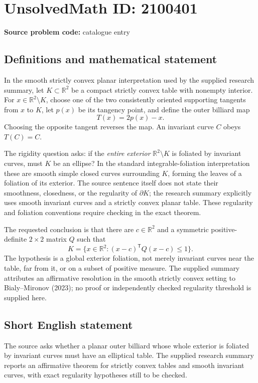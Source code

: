 \documentclass[11pt]{article}
\newcommand{\R}{\mathbb{R}}
\begin{document}
\section*{UnsolvedMath ID: 2100401}
\textbf{Source problem code:} catalogue entry
\subsection{Definitions and mathematical statement}
In the smooth strictly convex planar interpretation used by the supplied research summary, let $K\subset\R^2$ be a compact strictly convex table with nonempty interior. For $x\in\R^2\setminus K$, choose one of the two consistently oriented supporting tangents from $x$ to $K$, let $p(x)$ be its tangency point, and define the outer billiard map
\[
T(x)=2p(x)-x.
\]
Choosing the opposite tangent reverses the map. An invariant curve $C$ obeys $T(C)=C$.

The rigidity question asks: if the \emph{entire exterior} $\R^2\setminus K$ is foliated by invariant curves, must $K$ be an ellipse? In the standard integrable-foliation interpretation these are smooth simple closed curves surrounding $K$, forming the leaves of a foliation of its exterior. The source sentence itself does not state their smoothness, closedness, or the regularity of $\partial K$; the research summary explicitly uses smooth invariant curves and a strictly convex planar table. These regularity and foliation conventions require checking in the exact theorem.

The requested conclusion is that there are $c\in\R^2$ and a symmetric positive-definite $2\times2$ matrix $Q$ such that
\[
K=\{x\in\R^2:(x-c)^{\mathsf T}Q(x-c)\leq1\}.
\]
The hypothesis is a global exterior foliation, not merely invariant curves near the table, far from it, or on a subset of positive measure. The supplied summary attributes an affirmative resolution in the smooth strictly convex setting to Bialy--Mironov (2023); no proof or independently checked regularity threshold is supplied here.
\subsection{Short English statement}
The source asks whether a planar outer billiard whose whole exterior is foliated by invariant curves must have an elliptical table. The supplied research summary reports an affirmative theorem for strictly convex tables and smooth invariant curves, with exact regularity hypotheses still to be checked.
\end{document}
